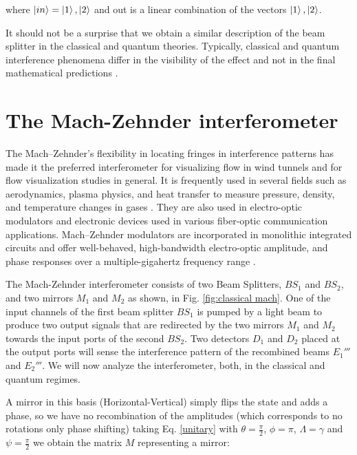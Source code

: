 \documentclass[12pt]{book}
\begin{document}
where $\ket{in}=\ket{1},\ket{2}$ and out is a linear combination of the vectors $\ket{1},\ket{2}$.

 It should not be a surprise that we obtain a similar description of the beam splitter in the classical and quantum theories. Typically, classical and quantum interference phenomena differ in the visibility of the effect and not in the final mathematical predictions \cite{leonhardt}.

\pagebreak

\chapter{The Mach-Zehnder interferometer }


 The Mach–Zehnder's flexibility in locating fringes in interference patterns has made it the preferred interferometer for visualizing flow in wind tunnels \cite{10} and for flow visualization studies in general. It is frequently used in several fields such as aerodynamics, plasma physics, and heat transfer to measure pressure, density, and temperature changes in gases \cite{11}. They are also used in electro-optic modulators \cite{ackerman} and electronic devices used in various fiber-optic communication applications. Mach–Zehnder modulators are incorporated in monolithic integrated circuits and offer well-behaved, high-bandwidth electro-optic amplitude, and phase responses over a multiple-gigahertz frequency range \cite{studenkov,capmany}.

The Mach-Zehnder interferometer consists of two Beam Splitters, $BS_{1}$ and $BS_{2}$, and two mirrors $M_{1}$ and $M_{2}$ as shown, in Fig. \ref{fig:classical mach}. One of the input channels of the first beam splitter $BS_{1}$ is pumped by a light beam to produce two output signals that are redirected by the two mirrors $M_{1}$ and $M_{2}$ towards the input ports of the second $BS_{2}$.  Two detectors $D_{1}$ and $D_{2}$ placed at the output ports will  sense the interference pattern of the recombined beams $E_{1}'''$ and $E_{2}'''$. We will now analyze the interferometer, both, in the classical and quantum regimes.


 A mirror in this basis (Horizontal-Vertical) simply flips the state and adds a phase, so we have no recombination of the amplitudes (which corresponds to no rotations only phase shifting) taking Eq. \ref{unitary} with $\theta=\frac{\pi}{2}$, $\phi=\pi$, $\Lambda=\gamma$ and $\psi= \frac{\pi}{2} $ we obtain the matrix $M$ representing a mirror:
\end{document}
